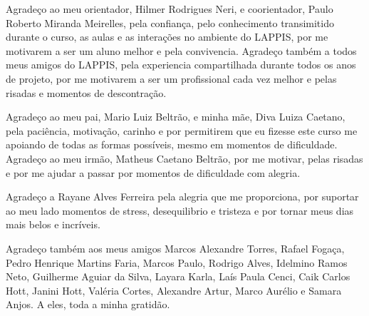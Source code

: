 \begin{agradecimentos}

    Agradeço ao meu orientador, Hilmer Rodrigues Neri, e coorientador, Paulo Roberto Miranda Meirelles, pela confiança, pelo conhecimento transimitido durante o curso, as aulas e as interações no ambiente do LAPPIS, por me motivarem a ser um aluno melhor e pela convivencia. Agradeço também a todos meus amigos do LAPPIS, pela experiencia compartilhada durante todos os anos de projeto, por me motivarem a ser um profissional cada vez melhor e pelas risadas e momentos de descontração.

    Agradeço ao meu pai, Mario Luiz Beltrão, e minha mãe, Diva Luiza Caetano, pela paciência, motivação, carinho e por permitirem que eu fizesse este curso me apoiando de todas as formas possíveis, mesmo em momentos de dificuldade. Agradeço ao meu irmão, Matheus Caetano Beltrão, por me motivar, pelas risadas e por me ajudar a passar por momentos de dificuldade com alegria.

    Agradeço a Rayane Alves Ferreira pela alegria que me proporciona, por suportar ao meu lado momentos de stress, desequilibrio e tristeza e por tornar meus dias mais belos e incríveis.

    Agradeço também aos meus amigos Marcos Alexandre Torres, Rafael Fogaça, Pedro Henrique Martins Faria, Marcos Paulo, Rodrigo Alves, Idelmino Ramos Neto, Guilherme Aguiar da Silva, Layara Karla, Laís Paula Cenci, Caik Carlos Hott, Janini Hott, Valéria Cortes, Alexandre Artur, Marco Aurélio e Samara Anjos. A eles, toda a minha gratidão.
\end{agradecimentos}
